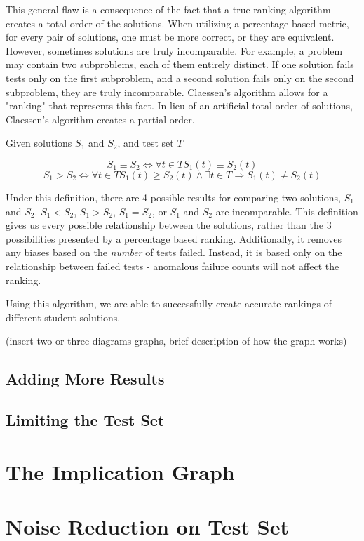 \documentclass[11pt]{article}
\begin{document}
This general flaw is a consequence of the fact that a true ranking algorithm creates a total order of the solutions. When utilizing a percentage based metric, for every pair of solutions, one must be more correct, or they are equivalent. However, sometimes solutions are truly incomparable. For example, a problem may contain two subproblems, each of them entirely distinct. If one solution fails tests only on the first subproblem, and a second solution fails only on the second subproblem, they are truly incomparable. Claessen's algorithm allows for a "ranking" that represents this fact. In lieu of an artificial total order of solutions, Claessen's algorithm creates a partial order.

\centerline{Given solutions $S_1$ and $S_2$, and test set $T$}
$$S_1 \equiv S_2 \iff \forall t \in T S_1(t) \equiv S_2(t)$$
$$S_1 > S_2 \iff \forall t \in T S_1(t) \geq S_2(t) \wedge \exists t \in T \Rightarrow S_1(t) \neq S_2(t)$$

Under this definition, there are 4 possible results for comparing two solutions, $S_1$ and $S_2$. $S_1 < S_2$, $S_1 > S_2$, $S_1 = S_2$, or $S_1$ and $S_2$  are incomparable. This definition gives us every possible relationship between the solutions, rather than the 3 possibilities presented by a percentage based ranking. Additionally, it removes any biases based on the \emph{number} of tests failed. Instead, it is based only on the relationship between failed tests - anomalous failure counts will not affect the ranking.

Using this algorithm, we are able to successfully create accurate rankings of different student solutions.

(insert two or three diagrams graphs, brief description of how the graph works)
\subsection*{Adding More Results}
\subsection*{Limiting the Test Set}

\section{The Implication Graph}

\section{Noise Reduction on Test Set}
\end{document}
